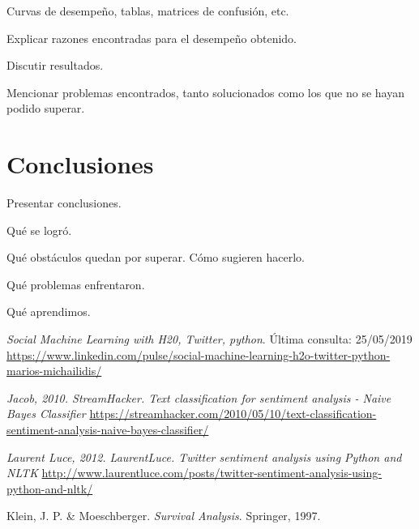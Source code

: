 \documentclass[sigconf, nonacm, spanish]{acmart}
\begin{document}
Curvas de desempeño, tablas, matrices de confusión, etc.

Explicar razones encontradas para el desempeño obtenido.

Discutir resultados.

Mencionar problemas encontrados, tanto solucionados como los que no se hayan podido superar.

\section{Conclusiones}

Presentar conclusiones.

Qué se logró.

Qué obstáculos quedan por superar. Cómo sugieren hacerlo.

Qué problemas enfrentaron.

Qué aprendimos.



\begin{thebibliography}{4}

\textit{Social Machine Learning with H20, Twitter, python}. Última consulta: 25/05/2019
\url{https://www.linkedin.com/pulse/social-machine-learning-h2o-twitter-python-marios-michailidis/}

\textit{Jacob, 2010. StreamHacker. Text classification for sentiment analysis - Naive Bayes Classifier}
\url{https://streamhacker.com/2010/05/10/text-classification-sentiment-analysis-naive-bayes-classifier/}

\textit{Laurent Luce, 2012. LaurentLuce. Twitter sentiment analysis using Python and NLTK}
\url{http://www.laurentluce.com/posts/twitter-sentiment-analysis-using-python-and-nltk/}

Klein, J. P. \& Moeschberger.
\textit{Survival Analysis}.
Springer, 1997. 

\end{thebibliography}
\end{document}
